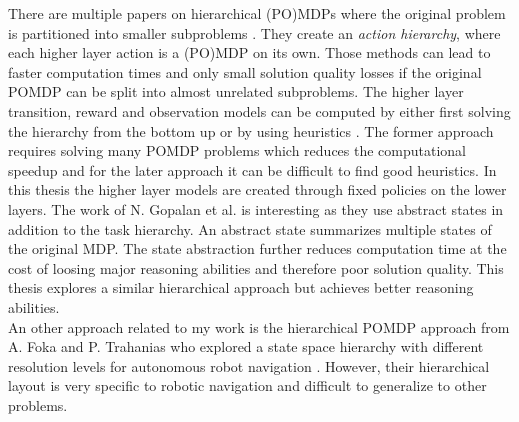 There are multiple papers on hierarchical (PO)MDPs where the original problem is partitioned into smaller subproblems \cite{Pineau02anintegrated, rmax, Gopalan2017PlanningWA}.  They create an \textit{action hierarchy}, where each higher layer action is a (PO)MDP on its own. Those methods can lead to faster computation times and only small solution quality losses if the original POMDP can be split into almost unrelated subproblems. The higher layer transition, reward and observation models can be computed by either first solving the hierarchy from the bottom up \cite{Pineau02anintegrated, rmax} or by using heuristics \cite{Gopalan2017PlanningWA}. The former approach requires solving many POMDP problems which reduces the computational speedup and for the later approach it can be difficult to find good heuristics. In this thesis the higher layer models are created through fixed policies on the lower layers. The work of N. Gopalan et al. \cite{Gopalan2017PlanningWA} is interesting as they use abstract states in addition to the task hierarchy. An abstract state summarizes multiple states of the original MDP. The state abstraction further reduces computation time at the cost of loosing major reasoning abilities and therefore poor solution quality. This thesis explores a similar hierarchical approach but achieves better reasoning abilities.\\
An other approach related to my work is the hierarchical POMDP approach from A. Foka and P. Trahanias who explored a state space hierarchy with different resolution levels for autonomous robot navigation \cite{FOKA2007561}. However, their hierarchical layout is very specific to robotic navigation and difficult to generalize to other problems. 
